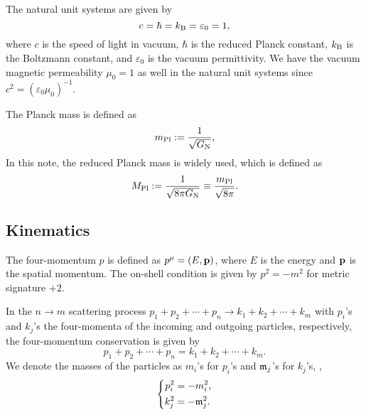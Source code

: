 \documentclass{article}
\begin{document}
            The natural unit systems are given by 
            \begin{equation}
                c = \hbar = k_\mathrm{B} = \varepsilon_0 = 1,
            \end{equation}
            where $c$ is the speed of light in vacuum, $\hbar$ is the reduced Planck constant, $k_\mathrm{B}$ is the Boltzmann constant, and $\varepsilon_0$ is the vacuum permittivity.
            We have the vacuum magnetic permeability $\mu_0 = 1$ as well in the natural unit systems since $c^2 = (\varepsilon_0 \mu_0)^{-1}$.
            

            The Planck mass is defined as
            \begin{equation}
                m_\mathrm{Pl} := \frac{1}{\sqrt{G_\mathrm{N}}},
            \end{equation}
            In this note, the reduced Planck mass is widely used, which is defined as
            \begin{equation}
                M_\mathrm{Pl} := \frac{1}{\sqrt{8 \pi G_\mathrm{N}}} \equiv \frac{m_\mathrm{Pl}}{\sqrt{8 \pi}}.
                \label{eq:reduced-Planck-mass}
            \end{equation}

        \subsection{Kinematics}

            The four-momentum $p$ is defined as $p^\mu = (E, \vb{p})$, where $E$ is the energy and $\vb{p}$ is the spatial momentum.
            The on-shell condition is given by $p^2 = -m^2$ for metric signature $+2$.

            In the $n \to m$ scattering process $p_1 + p_2 + \cdots + p_n \to k_1 + k_2 + \cdots + k_m$ with $p_i$'s and $k_j$'s the four-momenta of the incoming and outgoing particles, respectively, the four-momentum conservation is given by
            \begin{equation}
                p_1 + p_2 + \cdots + p_n = k_1 + k_2 + \cdots + k_m.
            \end{equation}
            We denote the masses of the particles as $m_i$'s for $p_i$'s and $\mathfrak{m}_j$'s for $k_j$'s, \ie,
            \begin{equation}
                \left\{
                    \begin{aligned}
                        p_i^2 & = -m_i^2, \\
                        k_j^2 & = -\mathfrak{m}_j^2.
                    \end{aligned}
                \right.
            \end{equation}
            
\end{document}
